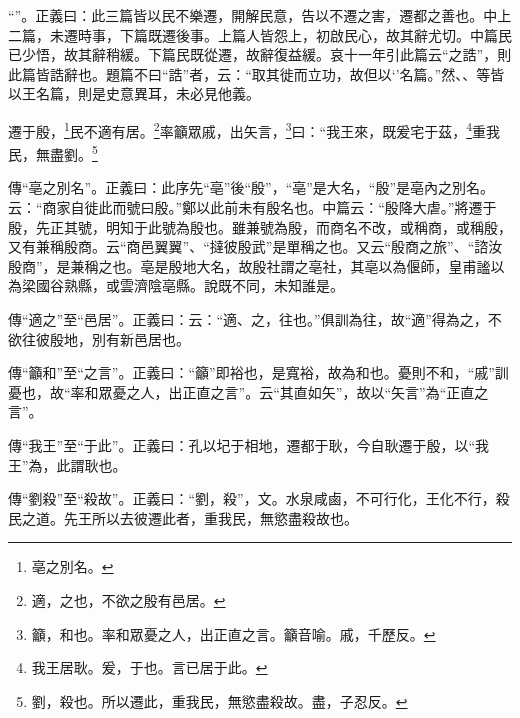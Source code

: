 {\noindent\shu{}\fzkt “”。正義曰：此三篇皆以民不樂遷，開解民意，告以不遷之害，遷都之善也。中上二篇，未遷時事，下篇既遷後事。上篇人皆怨上，初啟民心，故其辭尤切。中篇民已少悟，故其辭稍緩。下篇民既從遷，故辭復益緩。哀十一年引此篇云“之誥”，則此篇皆誥辭也。題篇不曰“誥”者，云：“取其徙而立功，故但以‘’名篇。”然、、等皆以王名篇，則是史意異耳，未必見他義。 \par}

遷于殷，\footnote{亳之別名。}民不適有居。\footnote{適，之也，不欲之殷有邑居。}率籲眾戚，出矢言，\footnote{籲，和也。率和眾憂之人，出正直之言。籲音喻。戚，千歷反。}曰：“我王來，既爰宅于茲，\footnote{我王居耿。爰，于也。言已居于此。}重我民，無盡劉。\footnote{劉，殺也。所以遷此，重我民，無慾盡殺故。盡，子忍反。}



{\noindent\zhuan{}\fzbyks 傳“亳之別名”。正義曰：此序先“亳”後“殷”，“亳”是大名，“殷”是亳內之別名。云：“商家自徙此而號曰殷。”鄭以此前未有殷名也。中篇云：“殷降大虐。”將遷于殷，先正其號，明知于此號為殷也。雖兼號為殷，而商名不改，或稱商，或稱殷，又有兼稱殷商。云“商邑翼翼”、“撻彼殷武”是單稱之也。又云“殷商之旅”、“諮汝殷商”，是兼稱之也。亳是殷地大名，故殷社謂之亳社，其亳以為偃師，皇甫謐以為梁國谷熟縣，或雲濟陰亳縣。說既不同，未知誰是。 \par}

{\noindent\zhuan{}\fzbyks 傳“適之”至“邑居”。正義曰：云：“適、之，往也。”俱訓為往，故“適”得為之，不欲往彼殷地，別有新邑居也。 \par}

{\noindent\zhuan{}\fzbyks 傳“籲和”至“之言”。正義曰：“籲”即裕也，是寬裕，故為和也。憂則不和，“戚”訓憂也，故“率和眾憂之人，出正直之言”。云“其直如矢”，故以“矢言”為“正直之言”。 \par}

{\noindent\zhuan{}\fzbyks 傳“我王”至“于此”。正義曰：孔以圮于相地，遷都于耿，今自耿遷于殷，以“我王”為，此謂耿也。 \par}

{\noindent\zhuan{}\fzbyks 傳“劉殺”至“殺故”。正義曰：“劉，殺”，文。水泉咸鹵，不可行化，王化不行，殺民之道。先王所以去彼遷此者，重我民，無慾盡殺故也。 \par}

